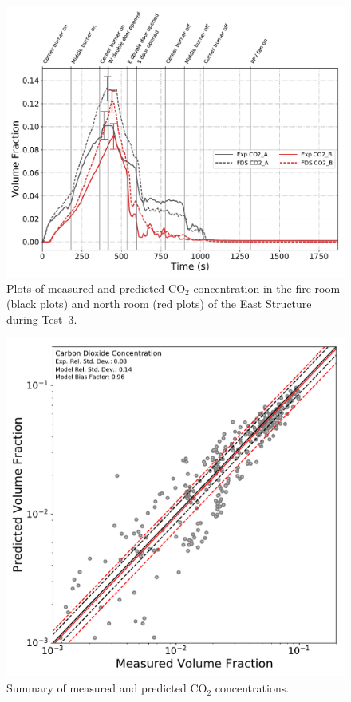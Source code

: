 \begin{figure}[!h]
	\centering
	\includegraphics[width=\columnwidth]{Figures/Plots/Validation/Gas_Concentration/Test_3_CO2}
	\caption[Plots of measured and predicted CO$_2$ concentration during Test~3.]{Plots of measured and predicted CO$_2$ concentration in the fire room (black plots) and north room (red plots) of the East Structure during Test~3.}
	\label{fig:Test3_CO2}
\end{figure}

\begin{figure}[!h]
	\centering
	\includegraphics[width=\columnwidth]{Figures/Plots/Validation/Gas_Concentration/loglog_CO2}
	\caption{Summary of measured and predicted CO$_2$ concentrations.}
	\label{fig:loglog_CO2}
\end{figure}

